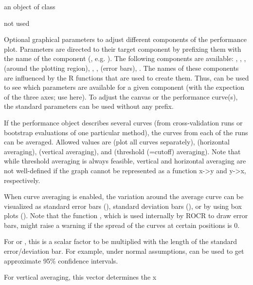 \begin{Arguments}
\begin{ldescription}
\item[\code{x}] an object of class 
\item[\code{y}] not used
\item[\code{...}] Optional graphical parameters to adjust different components of
the performance plot. Parameters are directed to their target component by
prefixing them with the name of the component
(, e.g. ). The following
components are available: , ,
,  (around the plotting region),
, ,  (error bars),
. The names of these components are influenced by the R
functions that are used to create them. Thus, 
can be used to see which parameters are available for a
given component (with the expection of the three axes; use
 here). To adjust the canvas or the performance
curve(s), the standard  parameters can be used without any prefix.
\item[\code{avg}] If the performance object describes several curves
(from cross-validation runs or bootstrap evaluations of one
particular method), the curves from each of the runs can be
averaged. Allowed values are  (plot all curves separately), 
(horizontal averaging),  (vertical averaging), and
 (threshold (=cutoff) averaging). Note that while
threshold averaging is always feasible, vertical and horizontal
averaging are not well-defined if the graph cannot be represented as
a function x-\textgreater{}y and y-\textgreater{}x, respectively.
\item[\code{spread.estimate}] When curve averaging is enabled, the variation
around the average curve can be visualized as standard error bars
(), standard deviation bars (), or by using
box plots (). Note that the function ,
which is used internally by ROCR to draw error bars, might raise a
warning if the spread of the curves at certain positions is 0.
\item[\code{spread.scale}] For  or , this is a
scalar factor to be multiplied with the length of the standard
error/deviation bar. For example, under normal assumptions,
 can be used to get approximate 95\% confidence
intervals.
\item[\code{show.spread.at}] For vertical averaging, this vector determines the x

\end{ldescription}
\end{Arguments}

